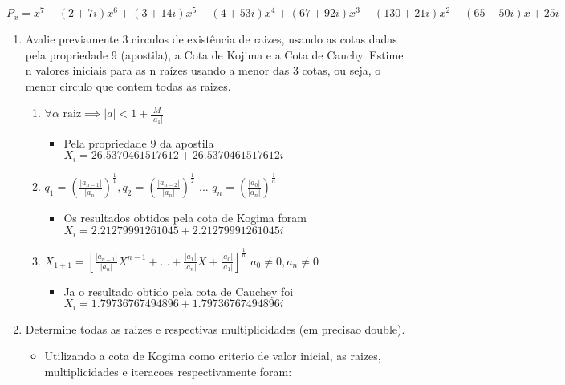 \documentclass[fleqn]{article}
\begin{document}
\item $P_{x} = x^7-(2+7 i) x^6+(3+14 i) x^5-(4+53 i) x^4+(67+92 i) x^3-(130+21 i) x^2+(65-50 i) x+25 i$
\begin{enumerate}
   \item Avalie previamente 3 circulos de existência de raizes, usando as cotas dadas pela propriedade 9 (apostila), a Cota de Kojima e a Cota de Cauchy. Estime n valores iniciais para as n raízes usando a menor das 3 cotas, ou seja, o menor circulo que contem todas as raizes.\\
      \begin{enumerate}
	 \item $\forall \alpha \textrm{ raiz} \implies |a| < 1 +                      \frac{M}{|a_{1}|} $
	    \begin{itemize}
	    \item Pela propriedade 9 da apostila $X_{i} = 26.5370461517612             + 26.5370461517612i$\\
	    \end{itemize}
	 \item $q_{1} = ({\frac{|a_{n-1}|}{|a_{n}|}})^\frac{1}{1} ,
	        q_{2} = ({\frac{|a_{n-2}|}{|a_{n}|}})^\frac{1}{2}$ ...
	        $q_{n} = ({\frac{|a_{0}|}{|a_{n}|}})^\frac{1}{n}$
	    \begin{itemize}
	    \item Os resultados obtidos pela cota de Kogima foram
	        $X_{i} = 2.21279991261045 + 2.21279991261045i$\\
	    \end{itemize}
	 \item $X_{1+1} = \left[\frac{|a_{n-1}|}{|a_{n}|}X^{n-1} + ... +
	       \frac{|a_{1}|}{|a_{n}|}X +\frac{|a_{0}|}{|a_{1}|}\right]
	       ^\frac{1}{n}$ $a_{0}\neq 0, a_{n}\neq 0$
	    \begin{itemize}
	    \item Ja o resultado obtido pela cota de Cauchey foi
	          $X_{i} = 1.79736767494896 + 1.79736767494896i$\\
	    \end{itemize}
      \end{enumerate}
   \item  Determine todas as raizes e respectivas multiplicidades (em         precisao double).
   \begin{itemize}
        \item Utilizando a cota de Kogima como criterio de valor         inicial, as raizes, multiplicidades e iteracoes respectivamente       foram:\\

\end{itemize}
\end{enumerate}
\end{document}
